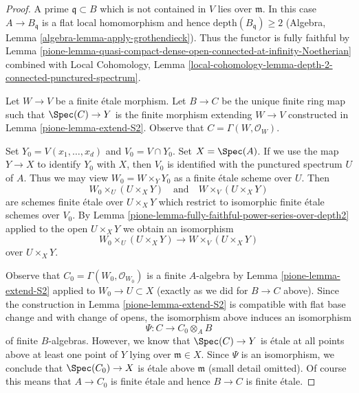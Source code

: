 \begin{proof}

A prime $\mathfrak q \subset B$ which is not contained in $V$
lies over $\mathfrak m$. In this case $A \to B_\mathfrak q$
is a flat local homomorphism and hence $\text{depth}(B_\mathfrak q) \geq 2$
(Algebra, Lemma \ref{algebra-lemma-apply-grothendieck}).
Thus the functor is fully faithful by
Lemma \ref{pione-lemma-quasi-compact-dense-open-connected-at-infinity-Noetherian}
combined with Local Cohomology,
Lemma \ref{local-cohomology-lemma-depth-2-connected-punctured-spectrum}.

\medskip\noindent
Let $W \to V$ be a finite \'etale morphism. Let $B \to C$ be the unique finite
ring map such that $\Spec(C) \to Y$ is the finite morphism extending
$W \to V$ constructed in Lemma \ref{pione-lemma-extend-S2}.
Observe that $C = \Gamma(W, \mathcal{O}_W)$.

\medskip\noindent
Set $Y_0 = V(x_1, \ldots, x_d)$ and $V_0 = V \cap Y_0$. Set $X = \Spec(A)$.
If we use the map $Y \to X$ to identify $Y_0$ with $X$,
then $V_0$ is identified with the punctured spectrum $U$ of $A$.
Thus we may view $W_0 = W \times_Y Y_0$ as a finite \'etale scheme
over $U$. Then
$$
W_0 \times_U (U \times_X Y)
\quad\text{and}\quad
W \times_V (U \times_X Y)
$$
are schemes finite \'etale over $U \times_X Y$ which restrict to
isomorphic finite \'etale schemes over $V_0$. By
Lemma \ref{pione-lemma-fully-faithful-power-series-over-depth2}
applied to the open $U \times_X Y$ we obtain an isomorphism
$$
W_0 \times_U (U \times_X Y) \longrightarrow W \times_V (U \times_X Y)
$$
over $U \times_X Y$.

\medskip\noindent
Observe that $C_0 = \Gamma(W_0, \mathcal{O}_{W_0})$ is a finite $A$-algebra
by Lemma \ref{pione-lemma-extend-S2} applied to $W_0 \to U \subset X$ (exactly
as we did for $B \to C$ above). Since the construction in
Lemma \ref{pione-lemma-extend-S2} is compatible with flat base change
and with change of opens, the isomorphism above induces
an isomorphism
$$
\Psi : C \longrightarrow C_0 \otimes_A B
$$
of finite $B$-algebras. However, we know that $\Spec(C) \to Y$
is \'etale at all points above at least one point of $Y$ lying
over $\mathfrak m \in X$. Since $\Psi$ is an isomorphism, we
conclude that $\Spec(C_0) \to X$
is \'etale above $\mathfrak m$ (small detail omitted).
Of course this means that $A \to C_0$ is finite
\'etale and hence $B \to C$ is finite \'etale.
\end{proof}

